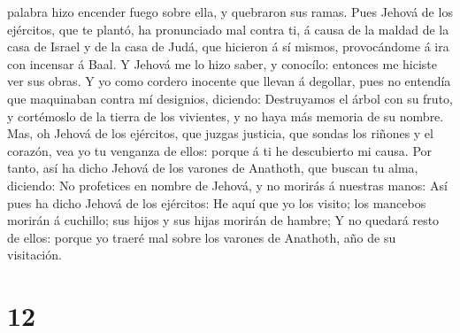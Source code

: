 palabra hizo encender fuego sobre ella, y quebraron sus ramas.
 Pues Jehová de los ejércitos, que te plantó, ha
pronunciado mal contra ti, á causa de la maldad de la casa de Israel y
de la casa de Judá, que hicieron á sí mismos, provocándome á ira con
incensar á Baal.  Y Jehová me lo hizo saber, y conocílo:
entonces me hiciste ver sus obras.  Y yo como cordero
inocente que llevan á degollar, pues no entendía que maquinaban contra
mí designios, diciendo: Destruyamos el árbol con su fruto, y cortémoslo
de la tierra de los vivientes, y no haya más memoria de su nombre.
 Mas, oh Jehová de los ejércitos, que juzgas justicia,
que sondas los riñones y el corazón, vea yo tu venganza de ellos: porque
á ti he descubierto mi causa.  Por tanto, así ha dicho
Jehová de los varones de Anathoth, que buscan tu alma, diciendo: No
profetices en nombre de Jehová, y no morirás á nuestras manos:
 Así pues ha dicho Jehová de los ejércitos: He aquí que
yo los visito; los mancebos morirán á cuchillo; sus hijos y sus hijas
morirán de hambre;  Y no quedará resto de ellos: porque
yo traeré mal sobre los varones de Anathoth, año de su visitación.

\hypertarget{section-11}{%
\section{12}\label{section-11}}

